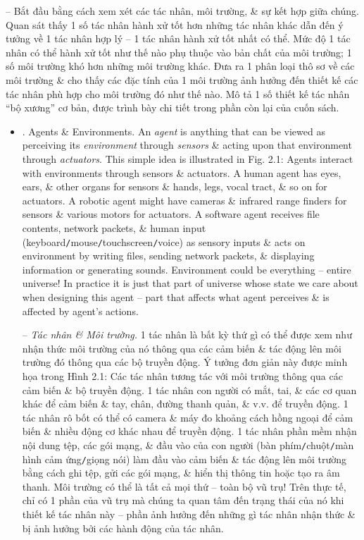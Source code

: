 \documentclass{article}
\begin{document}
\begin{itemize}
\begin{itemize}
		-- Bắt đầu bằng cách xem xét các tác nhân, môi trường, \& sự kết hợp giữa chúng. Quan sát thấy 1 số tác nhân hành xử tốt hơn những tác nhân khác dẫn đến ý tưởng về 1 tác nhân hợp lý -- 1 tác nhân hành xử tốt nhất có thể. Mức độ 1 tác nhân có thể hành xử tốt như thế nào phụ thuộc vào bản chất của môi trường; 1 số môi trường khó hơn những môi trường khác. Đưa ra 1 phân loại thô sơ về các môi trường \& cho thấy các đặc tính của 1 môi trường ảnh hưởng đến thiết kế các tác nhân phù hợp cho môi trường đó như thế nào. Mô tả 1 số thiết kế tác nhân ``bộ xương'' cơ bản, được trình bày chi tiết trong phần còn lại của cuốn sách.
		\begin{itemize}
			\item {. Agents \& Environments.} An {\it agent} is anything that can be viewed as perceiving its {\it environment} through {\it sensors} \& acting upon that environment through {\it actuators}. This simple idea is illustrated in {\sf Fig. 2.1: Agents interact with environments through sensors \& actuators}. A human agent has eyes, ears, \& other organs for sensors \& hands, legs, vocal tract, \& so on for actuators. A robotic agent might have cameras \& infrared range finders for sensors \& various motors for actuators. A software agent receives file contents, network packets, \& human input (keyboard{\tt/}mouse{\tt/}touchscreen{\tt/}voice) as sensory inputs \& acts on environment by writing files, sending network packets, \& displaying information or generating sounds. Environment could be everything -- entire universe! In practice it is just that part of universe whose state we care about when designing this agent -- part that affects what agent perceives \& is affected by agent's actions.

			-- {\it Tác nhân \& Môi trường.} 1 tác nhân là bất kỳ thứ gì có thể được xem như nhận thức môi trường của nó thông qua các cảm biến \& tác động lên môi trường đó thông qua các bộ truyền động. Ý tưởng đơn giản này được minh họa trong {\sf Hình 2.1: Các tác nhân tương tác với môi trường thông qua các cảm biến \& bộ truyền động}. 1 tác nhân con người có mắt, tai, \& các cơ quan khác để cảm biến \& tay, chân, đường thanh quản, \& v.v. để truyền động. 1 tác nhân rô bốt có thể có camera \& máy đo khoảng cách hồng ngoại để cảm biến \& nhiều động cơ khác nhau để truyền động. 1 tác nhân phần mềm nhận nội dung tệp, các gói mạng, \& đầu vào của con người (bàn phím{\tt/}chuột{\tt/}màn hình cảm ứng{\tt/}giọng nói) làm đầu vào cảm biến \& tác động lên môi trường bằng cách ghi tệp, gửi các gói mạng, \& hiển thị thông tin hoặc tạo ra âm thanh. Môi trường có thể là tất cả mọi thứ -- toàn bộ vũ trụ! Trên thực tế, chỉ có 1 phần của vũ trụ mà chúng ta quan tâm đến trạng thái của nó khi thiết kế tác nhân này -- phần ảnh hưởng đến những gì tác nhân nhận thức \& bị ảnh hưởng bởi các hành động của tác nhân.


\end{itemize}
\end{itemize}
\end{itemize}
\end{document}
